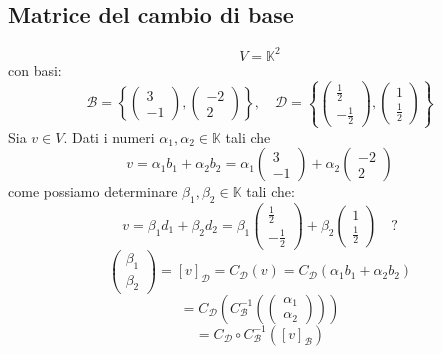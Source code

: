 \documentclass[a4paper]{article}
\theoremstyle{break}
\theoremstyle{break}
\theoremstyle{break}
\theoremstyle{break}
\begin{document}
\subsection{Matrice del cambio di base}
\begin{example}
  \[
  V = \mathbb{K}^2
  \] 
  con basi:
  \[
  \mathcal{B} = \left\{
    \begin{pmatrix} 
      3\\-1
    \end{pmatrix} ,
    \begin{pmatrix} 
      -2\\2
    \end{pmatrix} 
  \right\} , \quad
  \mathcal{D} = \left\{
    \begin{pmatrix} 
      \frac{1}{2}\\-\frac{1}{2}
    \end{pmatrix} ,
    \begin{pmatrix} 
      1\\\frac{1}{2}
    \end{pmatrix}
  \right\}
  \] 
  Sia \( v \in V \). Dati i numeri \( \alpha_1, \alpha_2 \in \mathbb{K} \) tali che
  \[ v = \alpha_1b_1 + \alpha_2b_2 = \alpha_1 \begin{pmatrix} 
    3\\-1
  \end{pmatrix} +
  \alpha_2 \begin{pmatrix} 
    -2\\2
  \end{pmatrix} 
\] 
come possiamo determinare \( \beta_1, \beta_2 \in \mathbb{K} \) tali che:
\[
v = \beta_1d_1 + \beta_2d_2 = \beta_1 \begin{pmatrix} 
  \frac{1}{2}\\-\frac{1}{2}
\end{pmatrix} +
\beta_2 \begin{pmatrix} 
  1\\\frac{1}{2}
\end{pmatrix} \quad ?
\] 
\[
  \begin{pmatrix} \beta_1\\\beta_2 \end{pmatrix} = [v]_{\mathcal{D}} = C_{\mathcal{D}}(v)
  = C_{\mathcal{D}}\left( \alpha_1 b_1 + \alpha_2 b_2 \right)
\] 
\[
  = C_{\mathcal{D}}\left( C_{\mathcal{B}}^{-1} \left(\begin{pmatrix} 
      \alpha_1\\
      \alpha_2
    \end{pmatrix} 
  \right)  \right)  
\] 
\[
  = C_{\mathcal{D}} \circ C_{\mathcal{B}}^{-1} \left( [v]_{\mathcal{B}} \right)
\] 
\begin{figure}[H]
  \centering
  

\end{figure}
\end{example}
\end{document}

